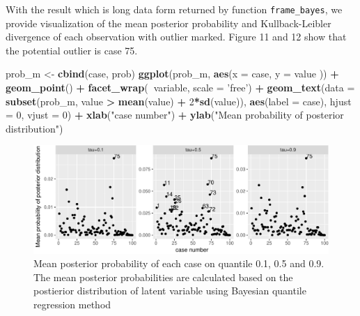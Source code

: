 \documentclass[11pt,a4paper,]{article}
\newenvironment{Shaded}{\begin{snugshade}}{\end{snugshade}}
\newcommand{\KeywordTok}[1]{\textcolor[rgb]{0.13,0.29,0.53}{\textbf{#1}}}
\newcommand{\DataTypeTok}[1]{\textcolor[rgb]{0.13,0.29,0.53}{#1}}
\newcommand{\DecValTok}[1]{\textcolor[rgb]{0.00,0.00,0.81}{#1}}
\newcommand{\StringTok}[1]{\textcolor[rgb]{0.31,0.60,0.02}{#1}}
\newcommand{\OperatorTok}[1]{\textcolor[rgb]{0.81,0.36,0.00}{\textbf{#1}}}
\newcommand{\NormalTok}[1]{#1}
\theoremstyle{definition}
\theoremstyle{definition}
\theoremstyle{remark}
\begin{document}
With the result which is long data form returned by function
\texttt{frame\_bayes}, we provide visualization of the mean posterior
probability and Kullback-Leibler divergence of each observation with
outlier marked. Figure 11 and 12 show that the potential outlier is case
75.

\begin{Shaded}
\begin{Highlighting}[]
\NormalTok{prob_m <-}\StringTok{ }\KeywordTok{cbind}\NormalTok{(case, prob)}
\KeywordTok{ggplot}\NormalTok{(prob_m, }\KeywordTok{aes}\NormalTok{(}\DataTypeTok{x =}\NormalTok{ case, }\DataTypeTok{y =}\NormalTok{ value )) }\OperatorTok{+}
\StringTok{   }\KeywordTok{geom_point}\NormalTok{() }\OperatorTok{+}
\StringTok{   }\KeywordTok{facet_wrap}\NormalTok{(}\OperatorTok{~}\NormalTok{variable, }\DataTypeTok{scale =} \StringTok{'free'}\NormalTok{) }\OperatorTok{+}
\StringTok{  }\KeywordTok{geom_text}\NormalTok{(}\DataTypeTok{data =} \KeywordTok{subset}\NormalTok{(prob_m, value }\OperatorTok{>}\StringTok{ }\KeywordTok{mean}\NormalTok{(value) }\OperatorTok{+}\StringTok{ }\DecValTok{2}\OperatorTok{*}\KeywordTok{sd}\NormalTok{(value)),}
            \KeywordTok{aes}\NormalTok{(}\DataTypeTok{label =}\NormalTok{ case), }\DataTypeTok{hjust =} \DecValTok{0}\NormalTok{, }\DataTypeTok{vjust =} \DecValTok{0}\NormalTok{) }\OperatorTok{+}
\StringTok{   }\KeywordTok{xlab}\NormalTok{(}\StringTok{"case number"}\NormalTok{) }\OperatorTok{+}
\StringTok{   }\KeywordTok{ylab}\NormalTok{(}\StringTok{"Mean probability of posterior distribution"}\NormalTok{)}
\end{Highlighting}
\end{Shaded}

\begin{figure}

{\centering \includegraphics{main_files/figure-latex/unnamed-chunk-9-1} 

}

\caption{Mean posterior probability of each case on quantile 0.1, 0.5 and 0.9. The mean posterior probabilities are calculated based on the postierior distribution of latent variable using Bayesian quantile regression method}\label{fig:unnamed-chunk-9}
\end{figure}
\end{document}
